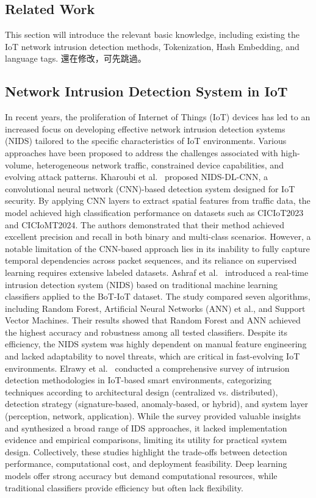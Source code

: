 \begin{ZhChapter}
    \chapter{Related Work}
    This section will introduce the relevant basic knowledge, including existing the IoT network intrusion detection methods, Tokenization, Hash Embedding, and language tags. 還在修改，可先跳過。

    \section{Network Intrusion Detection System in IoT}
    In recent years, the proliferation of Internet of Things (IoT) devices has led to an increased focus on developing effective network intrusion detection systems (NIDS) tailored to the specific characteristics of IoT environments. Various approaches have been proposed to address the challenges associated with high-volume, heterogeneous network traffic, constrained device capabilities, and evolving attack patterns. Kharoubi et al.~\cite{kharoubi2025nidscnn} proposed NIDS-DL-CNN, a convolutional neural network (CNN)-based detection system designed for IoT security. By applying CNN layers to extract spatial features from traffic data, the model achieved high classification performance on datasets such as CICIoT2023 and CICIoMT2024. The authors demonstrated that their method achieved excellent precision and recall in both binary and multi-class scenarios. However, a notable limitation of the CNN-based approach lies in its inability to fully capture temporal dependencies across packet sequences, and its reliance on supervised learning requires extensive labeled datasets. Ashraf et al.~\cite{ashraf2025inids} introduced a real-time intrusion detection system (NIDS) based on traditional machine learning classifiers applied to the BoT-IoT dataset. The study compared seven algorithms, including Random Forest, Artificial Neural Networks (ANN) et al., and Support Vector Machines. Their results showed that Random Forest and ANN achieved the highest accuracy and robustness among all tested classifiers. Despite its efficiency, the NIDS system was highly dependent on manual feature engineering and lacked adaptability to novel threats, which are critical in fast-evolving IoT environments. Elrawy et al.~\cite{elrawy2018survey} conducted a comprehensive survey of intrusion detection methodologies in IoT-based smart environments, categorizing techniques according to architectural design (centralized vs. distributed), detection strategy (signature-based, anomaly-based, or hybrid), and system layer (perception, network, application). While the survey provided valuable insights and synthesized a broad range of IDS approaches, it lacked implementation evidence and empirical comparisons, limiting its utility for practical system design. Collectively, these studies highlight the trade-offs between detection performance, computational cost, and deployment feasibility. Deep learning models offer strong accuracy but demand computational resources, while traditional classifiers provide efficiency but often lack flexibility.



\end{ZhChapter}
